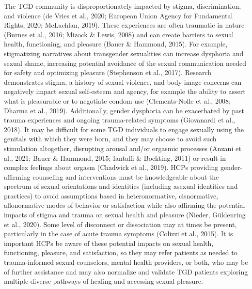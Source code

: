 \documentclass[
]{book}
\begin{document}
The TGD community is disproportionately
impacted by stigma, discrimination, and violence
(de Vries et al., 2020; European Union Agency
for Fundamental Rights, 2020; McLachlan, 2019).
These experiences are often traumatic in nature
(Burnes et al., 2016; Mizock \& Lewis, 2008) and
can create barriers to sexual health, functioning,
and pleasure (Bauer \& Hammond, 2015). For
example, stigmatizing narratives about
transgender sexualities can increase dysphoria
and sexual shame, increasing potential avoidance
of the sexual communication needed for safety
and optimizing pleasure (Stephenson et al.,
2017). Research demonstrates stigma, a history
of sexual violence, and body image concerns can
negatively impact sexual self-esteem and agency,
for example the ability to assert what is pleasurable or to negotiate condom use (Clements-Nolle
et al., 2008; Dharma et al., 2019). Additionally,
gender dysphoria can be exacerbated by past
trauma experiences and ongoing trauma-related
symptoms (Giovanardi et al., 2018). It may be
difficult for some TGD individuals to engage
sexually using the genitals with which they were
born, and they may choose to avoid such stimulation altogether, disrupting arousal and/or
orgasmic processes (Anzani et al., 2021; Bauer
\& Hammond, 2015; Iantaffi \& Bockting, 2011)
or result in complex feelings about orgasm
(Chadwick et al., 2019). HCPs providing
gender-affirming counseling and interventions
must be knowledgeable about the spectrum of
sexual orientations and identities (including asexual identities and practices) to avoid assumptions
based in heteronormative, cisnormative, allonormative modes of behavior or satisfaction while
also affirming the potential impacts of stigma
and trauma on sexual health and pleasure
(Nieder, Güldenring et al., 2020). Some level of
disconnect or dissociation may at times be present, particularly in the case of acute trauma
symptoms (Colizzi et al., 2015). It is important
HCPs be aware of these potential impacts on
sexual health, functioning, pleasure, and satisfaction, so they may refer patients as needed to
trauma-informed sexual counselors, mental
health providers, or both, who may be of further
assistance and may also normalize and validate
TGD patients exploring multiple diverse pathways of healing and accessing sexual pleasure.
\end{document}
